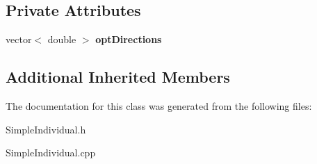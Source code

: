 \subsection*{Private Attributes}
\begin{DoxyCompactItemize}
\item 
\mbox{\label{classSimpleIndividual_a0c4b0d0759b905e1b66c2ab0588e32ef}} 
vector$<$ double $>$ {\bfseries opt\+Directions}
\end{DoxyCompactItemize}
\subsection*{Additional Inherited Members}


The documentation for this class was generated from the following files\+:\begin{DoxyCompactItemize}
\item 
Simple\+Individual.\+h\item 
Simple\+Individual.\+cpp\end{DoxyCompactItemize}
